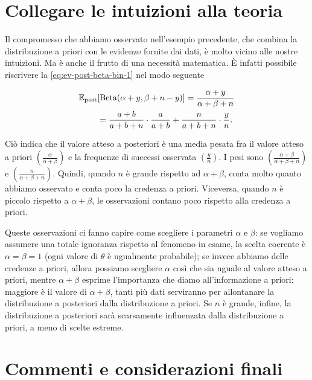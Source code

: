 \documentclass[
  11pt,
]{krantz}
\newcommand{\E}{\mathbb{E}} %
\theoremstyle{definition}
\theoremstyle{definition}
\theoremstyle{definition}
\theoremstyle{definition}
\theoremstyle{remark}
\begin{document}
\hypertarget{collegare-le-intuizioni-alla-teoria}{%
\section{Collegare le intuizioni alla teoria}\label{collegare-le-intuizioni-alla-teoria}}

Il compromesso che abbiamo osservato nell'esempio precedente, che combina la distribuzione a priori con le evidenze fornite dai dati, è molto vicino alle nostre intuizioni. Ma è anche il frutto di una necessità matematica. È infatti possibile riscrivere la \eqref{eq:ev-post-beta-bin-1} nel modo seguente

\begin{align}
\E_{\text{post}} &[\text{Beta}(\alpha + y, \beta + n - y)] = \frac{\alpha + y}{\alpha + \beta +n}\notag\\ 
&= \frac{a+b}{a+b+n} \cdot \frac{a}{a+b} + \frac{n}{a+b+n} \cdot \frac{y}{n}.
\label{eq:ev-post-beta-bin}
\end{align}

Ciò indica che il valore atteso a posteriori è una media pesata fra il valore atteso a priori \(\left( \frac{\alpha}{\alpha+\beta}\right)\) e la frequenze di successi osservata \(\left(\frac{y}{n}\right)\). I pesi sono \(\left( \frac{\alpha+\beta}{\alpha+\beta+n}\right)\) e \(\left( \frac{n}{\alpha+\beta+n}\right)\). Quindi, quando \(n\) è grande rispetto ad \(\alpha + \beta\), conta molto quanto abbiamo osservato e conta poco la credenza a priori. Viceversa, quando \(n\) è piccolo rispetto a \(\alpha + \beta\), le osservazioni contano poco rispetto alla credenza a priori.

Queste osservazioni ci fanno capire come scegliere i parametri \(\alpha\) e \(\beta\): se vogliamo assumere una totale ignoranza rispetto al fenomeno in esame, la scelta coerente è \(\alpha = \beta = 1\) (ogni valore di \(\theta\) è ugualmente probabile); se invece abbiamo delle credenze a priori, allora possiamo scegliere \(\alpha\) così che sia uguale al valore atteso a priori, mentre \(\alpha + \beta\) esprime l'importanza che diamo all'informazione a priori: maggiore è il valore di \(\alpha + \beta\), tanti più dati serviranno per allontanare la distribuzione a posteriori dalla distribuzione a priori. Se \(n\) è grande, infine, la distribuzione a posteriori sarà scarsamente influenzata dalla distribuzione a priori, a meno di scelte estreme.

\hypertarget{commenti-e-considerazioni-finali-2}{%
\section*{Commenti e considerazioni finali}\label{commenti-e-considerazioni-finali-2}}
\end{document}
